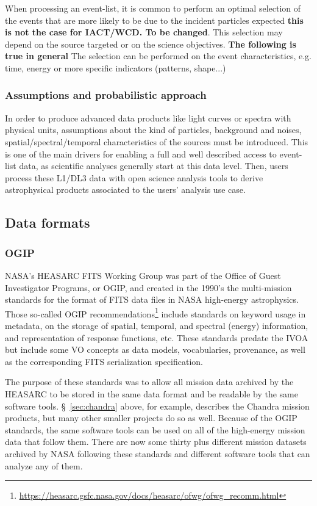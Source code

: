 \documentclass[11pt,a4paper]{ivoa}
\begin{document}
When processing an event-list, it is common to perform an optimal selection of the events that are more likely to be
due to the incident particles expected {\bf this is not the case for IACT/WCD. To be changed}. This selection may depend
on the source targeted or on the science objectives. {\bf The following is true in general} The selection can be
performed on the event characteristics, e.g. time, energy or more specific indicators (patterns, shape...)


\subsubsection{Assumptions and probabilistic approach}

In order to produce advanced data products like light curves or spectra with physical units, assumptions about the kind
of particles, background and noises, spatial/spectral/temporal characteristics of the sources must be introduced. This
is one of the main drivers for enabling a full and well described access to event-list data, as scientific analyses
generally start at this data level. Then, users process these L1/DL3 data with open science analysis tools to derive
astrophysical products associated to the users' analysis use case.

\subsection{Data formats}
\label{sec:data_formats}

\subsubsection{{OGIP}}\label{sec:ogip}

NASA's HEASARC FITS Working Group was part of the Office of Guest Investigator Programs, or OGIP, and created in the
1990's the multi-mission standards for the format of FITS data files in NASA high-energy astrophysics. Those so-called
OGIP recommendations\footnote{\url{https://heasarc.gsfc.nasa.gov/docs/heasarc/ofwg/ofwg_recomm.html}} include standards
on keyword usage in metadata, on the storage of spatial, temporal, and spectral (energy) information, and representation
of response functions, etc. These standards predate the IVOA but include some VO concepts as data models, vocabularies,
provenance, as well as the corresponding FITS serialization specification.

The purpose of these standards was to allow all mission data archived by the HEASARC to be stored in the same data format
and be readable by the same software tools. \S~\ref{sec:chandra} above, for example, describes the Chandra mission
products, but many other smaller projects do so as well. Because of the OGIP standards, the same software tools can be
used on all of the high-energy mission data that follow them. There are now some thirty plus different mission datasets
archived by NASA following these standards and different software tools that can analyze any of them.
\end{document}
